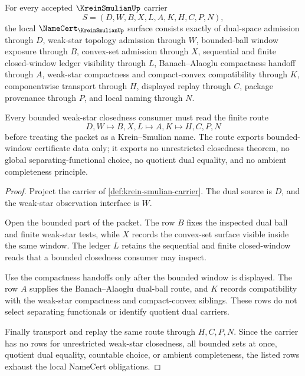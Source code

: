 \begin{theorem}
\label{thm:krein-smulian-namecert-obligations}
For every accepted $\KreinSmulianUp$ carrier
$$
S=(D,W,B,X,L,A,K,H,C,P,N),
$$
the local $\NameCert_{\KreinSmulianUp}$ surface consists exactly of dual-space admission through $D$, weak-star topology admission through $W$, bounded-ball window exposure through $B$, convex-set admission through $X$, sequential and finite closed-window ledger visibility through $L$, Banach--Alaoglu compactness handoff through $A$, weak-star compactness and compact-convex compatibility through $K$, componentwise transport through $H$, displayed replay through $C$, package provenance through $P$, and local naming through $N$.

Every bounded weak-star closedness consumer must read the finite route
$$
D,W \longmapsto B,X,L \longmapsto A,K \longmapsto H,C,P,N
$$
before treating the packet as a Krein--Smulian name. The route exports bounded-window certificate data only; it exports no unrestricted closedness theorem, no global separating-functional choice, no quotient dual equality, and no ambient completeness principle.
\end{theorem}
\begin{proof}
Project the carrier of \autoref{def:krein-smulian-carrier}. The dual source is $D$, and the weak-star observation interface is $W$.

Open the bounded part of the packet. The row $B$ fixes the inspected dual ball and finite weak-star tests, while $X$ records the convex-set surface visible inside the same window. The ledger $L$ retains the sequential and finite closed-window reads that a bounded closedness consumer may inspect.

Use the compactness handoffs only after the bounded window is displayed. The row $A$ supplies the Banach--Alaoglu dual-ball route, and $K$ records compatibility with the weak-star compactness and compact-convex siblings. These rows do not select separating functionals or identify quotient dual carriers.

Finally transport and replay the same route through $H,C,P,N$. Since the carrier has no rows for unrestricted weak-star closedness, all bounded sets at once, quotient dual equality, countable choice, or ambient completeness, the listed rows exhaust the local NameCert obligations.
\end{proof}


